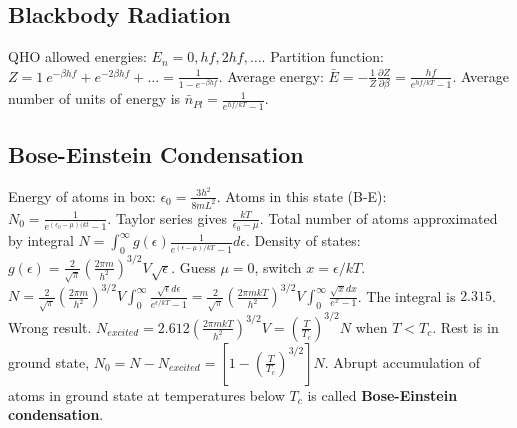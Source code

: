 \documentclass[11pt,twocolumn]{amsart}
\begin{document}
\subsection{Blackbody Radiation}
QHO allowed energies: $E_n = 0, hf, 2hf, \dots$. Partition function: $Z = 1 \ e^{-\beta hf} + e^{-2\beta hf} + \dots = \frac{1}{1-e^{-\beta hf}}$. Average energy: $\bar{E} = -\frac{1}{Z}\frac{\partial Z}{\partial \beta} = \frac{hf}{e^{hf/kT}-1}$. Average number of units of energy is $\bar{n}_{Pl} = \frac{1}{e^{hf/kT}-1}$.

\subsection{Bose-Einstein Condensation}
Energy of atoms in box: $\epsilon_0 = \frac{3h^2}{8mL^2}$. Atoms in this state (B-E):\\ $N_0 = \frac{1}{e^{(\epsilon_0-\mu)(kt} - 1}$. Taylor series gives $ \frac{kT}{\epsilon_0 - \mu}$. Total number of atoms approximated by integral $N = \int_0^{\infty} g(\epsilon) \frac{1}{e^{(\epsilon - \mu)/kT} - 1} d\epsilon$. Density of states: $g(\epsilon) = \frac{2}{\sqrt{\pi}}\left( \frac{2\pi m}{h^2} \right)^{3/2} V\sqrt{\epsilon}$. Guess $\mu = 0$, switch $x= \epsilon/kT$. $N = \frac{2}{\sqrt{\pi}}\left( \frac{2\pi m}{h^2} \right)^{3/2} V \int_0^\infty \frac{\sqrt{\epsilon}d\epsilon}{e^{\epsilon/kT}-1} = \frac{2}{\sqrt{\pi}}\left( \frac{2\pi m kT}{h^2} \right)^{3/2} V \int_0^\infty \frac{\sqrt{x}dx}{e^x - 1}$. The integral is $2.315$. Wrong result. $N_{excited} = 2.612 \left(\frac{2\pi m kT}{h^2} \right)^{3/2} V = \left(\frac{T}{T_c} \right)^{3/2}N$ when $T < T_c$. Rest is in ground state, $N_0 = N-N_{excited} = \left[1- \left(\frac{T}{T_c} \right)^{3/2} \right]N$. Abrupt accumulation of atoms in ground state at temperatures below $T_c$ is called \textbf{Bose-Einstein condensation}.
\end{document}
